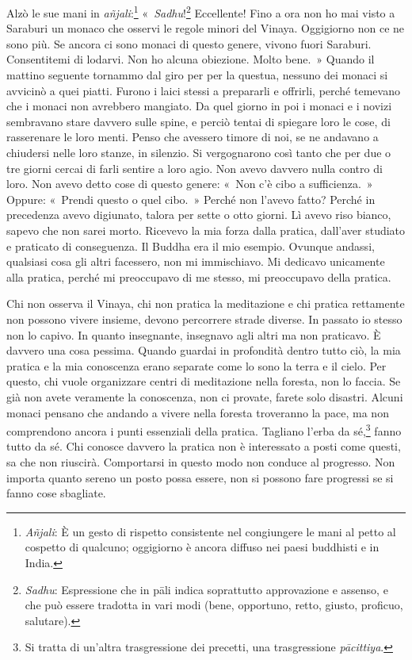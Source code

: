 Alzò le sue mani in \emph{añjali}:\footnote{\emph{Añjali}: È un gesto di
  rispetto consistente nel congiungere le mani al petto al cospetto di
  qualcuno; oggigiorno è ancora diffuso nei paesi buddhisti e in India.}
«~\emph{Sadhu}!\footnote{\emph{Sadhu}: Espressione che in pāli indica
  soprattutto approvazione e assenso, e che può essere tradotta in vari
  modi (bene, opportuno, retto, giusto, proficuo, salutare).}
Eccellente! Fino a ora non ho mai visto a Saraburi un monaco che osservi
le regole minori del Vinaya. Oggigiorno non ce ne sono più. Se ancora ci
sono monaci di questo genere, vivono fuori Saraburi. Consentitemi di
lodarvi. Non ho alcuna obiezione. Molto bene.~» Quando il mattino
seguente tornammo dal giro per per la questua, nessuno dei monaci si
avvicinò a quei piatti. Furono i laici stessi a prepararli e offrirli,
perché temevano che i monaci non avrebbero mangiato. Da quel giorno in
poi i monaci e i novizi sembravano stare davvero sulle spine, e perciò
tentai di spiegare loro le cose, di rasserenare le loro menti. Penso che
avessero timore di noi, se ne andavano a chiudersi nelle loro stanze, in
silenzio. Si vergognarono così tanto che per due o tre giorni cercai di
farli sentire a loro agio. Non avevo davvero nulla contro di loro. Non
avevo detto cose di questo genere: «~Non c'è cibo a sufficienza.~»
Oppure: «~Prendi questo o quel cibo.~» Perché non l'avevo fatto? Perché
in precedenza avevo digiunato, talora per sette o otto giorni. Lì avevo
riso bianco, sapevo che non sarei morto. Ricevevo la mia forza dalla
pratica, dall'aver studiato e praticato di conseguenza. Il Buddha era il
mio esempio. Ovunque andassi, qualsiasi cosa gli altri facessero, non mi
immischiavo. Mi dedicavo unicamente alla pratica, perché mi preoccupavo
di me stesso, mi preoccupavo della pratica.

Chi non osserva il Vinaya, chi non pratica la meditazione e chi pratica
rettamente non possono vivere insieme, devono percorrere strade diverse.
In passato io stesso non lo capivo. In quanto insegnante, insegnavo agli
altri ma non praticavo. È davvero una cosa pessima. Quando guardai in
profondità dentro tutto ciò, la mia pratica e la mia conoscenza erano
separate come lo sono la terra e il cielo. Per questo, chi vuole
organizzare centri di meditazione nella foresta, non lo faccia. Se già
non avete veramente la conoscenza, non ci provate, farete solo disastri.
Alcuni monaci pensano che andando a vivere nella foresta troveranno la
pace, ma non comprendono ancora i punti essenziali della pratica.
Tagliano l'erba da sé,\footnote{Si tratta di un'altra trasgressione dei
  precetti, una trasgressione \emph{pācittiya}.} fanno tutto da sé. Chi
conosce davvero la pratica non è interessato a posti come questi, sa che
non riuscirà. Comportarsi in questo modo non conduce al progresso. Non
importa quanto sereno un posto possa essere, non si possono fare
progressi se si fanno cose sbagliate.

